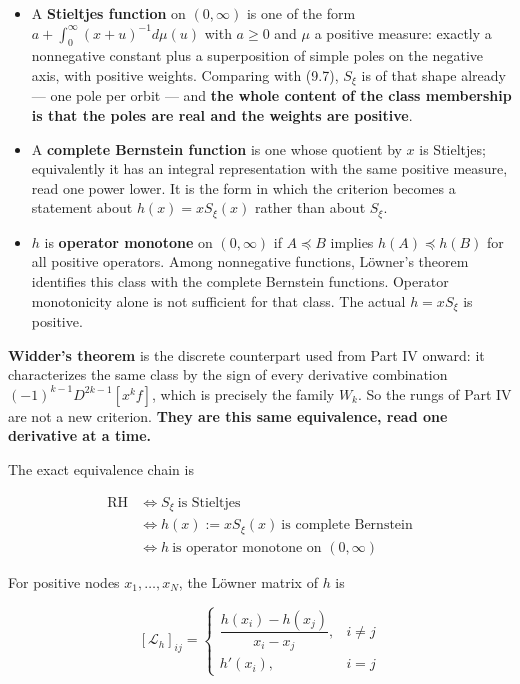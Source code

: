 \documentclass[
  11pt,
]{book}
\providecommand{\tightlist}{%
  \setlength{\itemsep}{0pt}\setlength{\parskip}{0pt}}
\begin{document}
\begin{itemize}
\tightlist
\item
  A \textbf{Stieltjes function} on \((0,\infty)\) is one of the form
  \(a+\int_0^\infty(x+u)^{-1}d\mu(u)\) with \(a\ge0\) and \(\mu\) a
  positive measure: exactly a nonnegative constant plus a superposition
  of simple poles on the negative axis, with positive weights. Comparing
  with (9.7), \(S_\xi\) is of that shape already --- one pole per orbit
  --- and \textbf{the whole content of the class membership is that the
  poles are real and the weights are positive}.
\item
  A \textbf{complete Bernstein function} is one whose quotient by \(x\)
  is Stieltjes; equivalently it has an integral representation with the
  same positive measure, read one power lower. It is the form in which
  the criterion becomes a statement about \(h(x)=xS_\xi(x)\) rather than
  about \(S_\xi\).
\item
  \(h\) is \textbf{operator monotone} on \((0,\infty)\) if
  \(A\preceq B\) implies \(h(A)\preceq h(B)\) for all positive
  operators. Among nonnegative functions, Löwner's theorem identifies
  this class with the complete Bernstein functions. Operator
  monotonicity alone is not sufficient for that class. The actual
  \(h=xS_\xi\) is positive.
\end{itemize}

\textbf{Widder's theorem} is the discrete counterpart used from Part IV
onward: it characterizes the same class by the sign of every derivative
combination \((-1)^{k-1}D^{2k-1}[x^kf]\), which is precisely the family
\(W_k\). So the rungs of Part IV are not a new criterion. \textbf{They
are this same equivalence, read one derivative at a time.}

The exact equivalence chain is

\[
\boxed{\begin{aligned}
\mathrm{RH}&\iff S_\xi\ \text{is Stieltjes}\\
&\iff h(x):=xS_\xi(x)\ \text{is complete Bernstein}\\
&\iff h\ \text{is operator monotone on }(0,\infty)
\end{aligned}}
\tag{10.2}
\]

For positive nodes \(x_1,\ldots,x_N\), the Löwner matrix of \(h\) is

\[
[\mathcal L_h]_{ij}=
\begin{cases}
\dfrac{h(x_i)-h(x_j)}{x_i-x_j},&i\ne j\\[2mm]
h'(x_i),&i=j
\end{cases}
\tag{10.3}
\]
\end{document}

